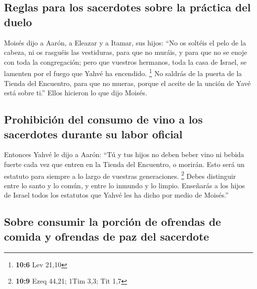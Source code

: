 \begin{paracol}{2}
\hypertarget{reglas-para-los-sacerdotes-sobre-la-pruxe1ctica-del-duelo}{%
\subsection{Reglas para los sacerdotes sobre la práctica del
duelo}\label{reglas-para-los-sacerdotes-sobre-la-pruxe1ctica-del-duelo}}

 Moisés dijo a Aarón, a Eleazar y a Itamar, sus hijos:
``No os soltéis el pelo de la cabeza, ni os rasguéis las vestiduras,
para que no muráis, y para que no se enoje con toda la congregación;
pero que vuestros hermanos, toda la casa de Israel, se lamenten por el
fuego que Yahvé ha encendido. \footnote{\textbf{10:6} Lev 21,10}
 No saldrás de la puerta de la Tienda del Encuentro, para
que no mueras, porque el aceite de la unción de Yavé está sobre ti.''
Ellos hicieron lo que dijo Moisés.

\hypertarget{prohibiciuxf3n-del-consumo-de-vino-a-los-sacerdotes-durante-su-labor-oficial}{%
\subsection{Prohibición del consumo de vino a los sacerdotes durante su
labor
oficial}\label{prohibiciuxf3n-del-consumo-de-vino-a-los-sacerdotes-durante-su-labor-oficial}}

 Entonces Yahvé le dijo a Aarón:  ``Tú y tus
hijos no deben beber vino ni bebida fuerte cada vez que entren en la
Tienda del Encuentro, o morirán. Esto será un estatuto para siempre a lo
largo de vuestras generaciones. \footnote{\textbf{10:9} Ezeq 44,21; 1Tim
  3,3; Tit 1,7}  Debes distinguir entre lo santo y lo
común, y entre lo inmundo y lo limpio.  Enseñarás a los
hijos de Israel todos los estatutos que Yahvé les ha dicho por medio de
Moisés.''

\hypertarget{sobre-consumir-la-porciuxf3n-de-ofrendas-de-comida-y-ofrendas-de-paz-del-sacerdote}{%
\subsection{Sobre consumir la porción de ofrendas de comida y ofrendas
de paz del
sacerdote}\label{sobre-consumir-la-porciuxf3n-de-ofrendas-de-comida-y-ofrendas-de-paz-del-sacerdote}}


\end{paracol}
